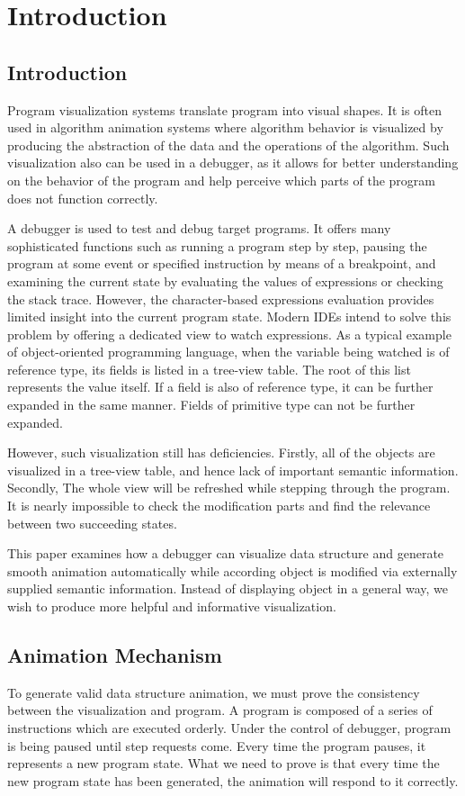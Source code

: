 \chapter {Introduction}
\label {chap: Introduction}

\section {Introduction}
Program visualization systems translate program into visual shapes. It is often used in algorithm animation systems where algorithm behavior is visualized by producing the abstraction of the data and the operations of the algorithm. Such visualization also can be used in a debugger, as it allows for better understanding on the behavior of the program and help perceive which parts of the program does not function correctly.

A debugger is used to test and debug target programs. It offers many sophisticated functions such as running a program step by step, pausing the program at some event or specified instruction by means of a breakpoint, and examining the current state by evaluating the values of expressions or checking the stack trace. However, the character-based expressions evaluation provides limited insight into the current program state. Modern IDEs intend to solve this problem by offering a dedicated view to watch expressions. As a typical example of object-oriented programming language, when the variable being watched is of reference type, its fields is listed in a tree-view table. The root of this list represents the value itself. If a field is also of reference type, it can be further expanded in the same manner. Fields of primitive type can not be further expanded.

However, such visualization still has deficiencies. Firstly, all of the objects are visualized in a tree-view table, and hence lack of important semantic information. Secondly, The whole view will be refreshed while stepping through the program. It is nearly impossible to check the modification parts and find the relevance between two succeeding states.

This paper examines how a debugger can visualize data structure and generate smooth animation automatically while according object is modified via externally supplied semantic information. Instead of displaying object in a general way, we wish to produce more helpful and informative visualization.

\section {Animation Mechanism}
To generate valid data structure animation, we must prove the consistency between the visualization and program. A program is composed of a series of instructions which are executed orderly. Under the control of debugger, program is being paused until step requests come. Every time the program pauses, it represents a new program state. What we need to prove is that every time the new program state has been generated, the animation will respond to it correctly.

